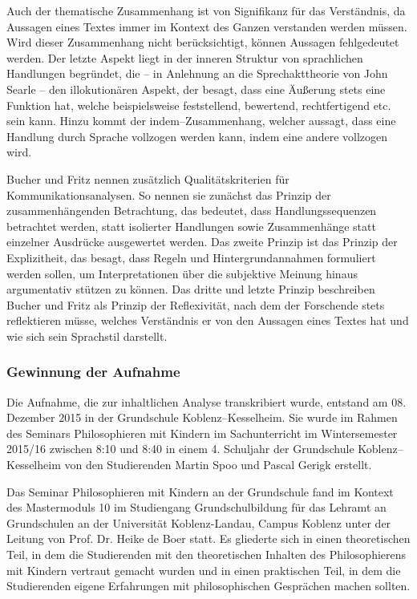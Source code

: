 Auch der thematische Zusammenhang ist von Signifikanz für das Verständnis, da Aussagen eines Textes immer im Kontext des Ganzen verstanden werden müssen. 
Wird dieser Zusammenhang nicht berücksichtigt, können Aussagen fehlgedeutet werden. 
Der letzte Aspekt liegt in der inneren Struktur von sprachlichen Handlungen begründet, die -- in Anlehnung an die Sprechakttheorie von John Searle -- den illokutionären Aspekt, der besagt, dass eine Äußerung stets eine Funktion hat, welche beispielsweise feststellend, bewertend, rechtfertigend etc. sein kann. 
Hinzu kommt der indem--Zusammenhang, welcher aussagt, dass eine Handlung durch Sprache vollzogen werden kann, indem eine andere vollzogen wird\cite[S.\, 137f]{HB80}.

Bucher und Fritz nennen zusätzlich Qualitätskriterien für Kommunikationsanalysen. 
So nennen sie zunächst das Prinzip der zusammenhängenden Betrachtung, das bedeutet, dass Handlungssequenzen betrachtet werden, statt isolierter Handlungen sowie Zusammenhänge statt einzelner Ausdrücke ausgewertet werden\cite[S.\,137f]{HB80}.
 Das zweite Prinzip ist das Prinzip der Explizitheit, das besagt, dass Regeln und Hintergrundannahmen formuliert werden sollen, um Interpretationen über die subjektive Meinung hinaus argumentativ stützen zu können. 
 Das dritte und letzte Prinzip beschreiben Bucher und Fritz als Prinzip der Reflexivität, nach dem der Forschende stets reflektieren müsse, welches Verständnis er von den Aussagen eines Textes hat und wie sich sein Sprachstil darstellt\cite[S.\,143]{HB80}.
 
 \newpage
 
 


\subsubsection{Gewinnung der Aufnahme}

Die Aufnahme, die zur inhaltlichen Analyse transkribiert wurde, entstand am 08. Dezember 2015 in der Grundschule Koblenz--Kesselheim. 
Sie wurde im Rahmen des Seminars \glqq Philosophieren mit Kindern im Sachunterricht\grqq{} im Wintersemester 2015/16 zwischen 8:10 und 8:40 in einem 4. Schuljahr der Grundschule Koblenz--Kesselheim von den Studierenden Martin Spoo und Pascal Gerigk erstellt. 

Das Seminar \glqq Philosophieren mit Kindern an der Grundschule\grqq{} fand im Kontext des Mastermoduls 10 im Studiengang Grundschulbildung für das Lehramt an Grundschulen an der Universität Koblenz-Landau, Campus Koblenz unter der Leitung von Prof. Dr. Heike de Boer statt. 
Es gliederte sich in einen theoretischen Teil, in dem die Studierenden mit den theoretischen Inhalten des Philosophierens mit Kindern vertraut gemacht wurden und in einen praktischen Teil, in dem die Studierenden eigene Erfahrungen mit philosophischen Gesprächen machen sollten.

